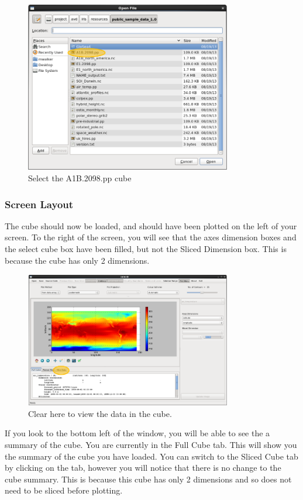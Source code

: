 \documentclass[a4paper,12pt]{article}
\begin{document}
\begin{figure}[H]
\centering{}
\includegraphics[width=90mm]{resources/tute2.PNG}
\caption{Select the A1B.2098.pp cube}
\label{overflow}
\end{figure}

\subsubsection{Screen Layout}

The cube should now be loaded, and should have been plotted on the left of
your screen. To the right of the screen, you will see that
the axes dimension boxes and the select cube box have been filled, but not the
Sliced Dimension box. This is because the cube has only 2 dimensions.

\begin{figure}[H]
\centering
\includegraphics[width=90mm]{resources/tute3.PNG}
\caption{Clear here to view the data in the cube.}
\label{overflow}
\end{figure}

If you look to the bottom left of the window, you will be able to see the a
summary of the cube. You are currently in the Full Cube tab. This will show
you the summary of the cube you have loaded. You can switch to the Sliced Cube
tab by clicking on the tab, however you will notice that there is no change to
the cube summary. This is because this cube has only 2 dimensions and so does
not need to be sliced before plotting.
\end{document}
